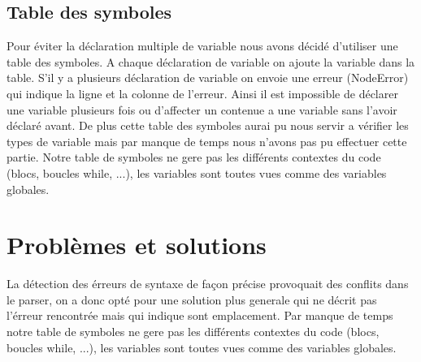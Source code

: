 \documentclass[10pt,a4paper]{report}
\begin{document}
\subsection{Table des symboles}
Pour éviter la déclaration multiple de variable nous avons décidé d'utiliser une table des symboles. A chaque déclaration de variable on ajoute la variable dans la table.
S'il y a plusieurs déclaration de variable on envoie une erreur (NodeError) qui indique la ligne et la colonne de l'erreur.
Ainsi il est impossible de déclarer une variable plusieurs fois ou d'affecter un contenue a une variable sans l'avoir déclaré avant.
De plus cette table des symboles aurai pu nous servir a vérifier les types de variable mais par manque de temps nous n'avons pas pu effectuer cette partie.
Notre table de symboles ne gere pas les différents contextes du code (blocs, boucles while, ...), les variables sont toutes vues comme des variables globales.

\section{Problèmes et solutions}

La détection des érreurs de syntaxe de façon précise provoquait des conflits dans le parser, on a donc opté pour une solution plus generale qui ne décrit pas l'érreur rencontrée mais qui indique sont emplacement.
Par manque de temps notre table de symboles ne gere pas les différents contextes du code (blocs, boucles while, ...), les variables sont toutes vues comme des variables globales.
\end{document}
